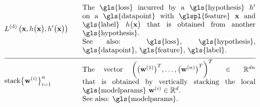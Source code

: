 \begin{align} 
	& \gtvloss{\featurevec}{\hypothesis\big(\featurevec\big)}{\hypothesis'\big(\featurevec\big)}& \quad & \parbox{.70\textwidth}{The \gls{loss} 
		incurred by a \gls{hypothesis} $\hypothesis'$ on a \gls{datapoint} with \glspl{feature} $\featurevec$ and \gls{label} 
		$\hypothesis\big( \featurevec\big)$ that is obtained from another \gls{hypothesis}.
		\\ See also: \gls{loss}, \gls{hypothesis}, \gls{datapoint}, \gls{feature}, \gls{label}. }\nonumber \\[2mm] \hline \nonumber\\[-5mm]
	& 	{\rm stack} \big\{ \weights^{(\nodeidx)} \big\}_{\nodeidx=1}^{\nrnodes} & \quad & \parbox{.70\textwidth}{The vector 
		$\bigg( \big(\weights^{(1)}  \big)^{T}, \ldots, \big(\weights^{(\nrnodes)}  \big)^{T} \bigg)^{T} \in \mathbb{R}^{\dimlocalmodel\nrnodes}$ that 
		is obtained by vertically stacking the local \gls{modelparams} $\weights^{(\nodeidx)} \in \mathbb{R}^{\dimlocalmodel}$.
		\\ See also: \gls{modelparams}. } \nonumber  
\end{align}        



